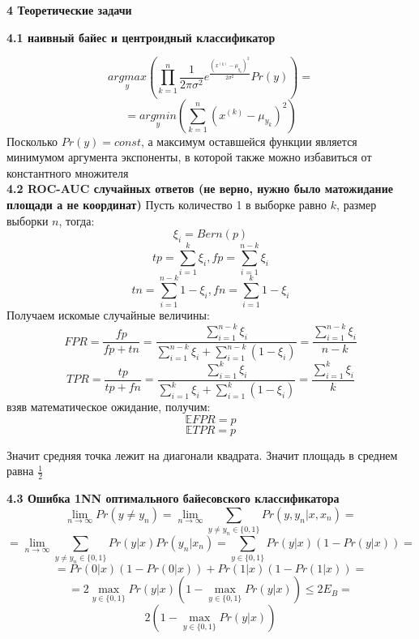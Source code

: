 \documentclass[11pt,a4paper]{article}
\begin{document}
\begin{center}
\Huge {
\noindent
\textbf{4 Теоретические задачи}
}
\end{center}
\Large {
\textbf {4.1 наивный байес и центроидный классификатор}
}

$$ \underset{y}{argmax} (\prod_{k=1}^{n} \frac{1}{2\pi \sigma^2}e^{\frac{(x^{(k)} - \mu_{y_k})^2}{2 \sigma^2}}  Pr(y)) = $$
$$=\underset{y}{argmin} (\sum_{k=1}^{n} (x^{(k)} - \mu_{y_k})^2) $$
Посколько $Pr(y) = const$,
а максимум оставшейся функции является минимумом аргумента экспоненты, в которой также можно избавиться от константного множителя
\\
\Large{
\textbf {4.2 ROC-AUC случайных ответов (не верно, нужно было матожидание площади а не координат)}
}
Пусть количество 1 в выборке равно $k$, размер выборки $n$, тогда:
\\
$$ \xi_i = Bern(p) $$
$$ tp = \sum_{i=1}^{k} \xi_i,  fp = \sum_{i=1}^{n - k} \xi_i$$
$$ tn = \sum_{i=1}^{n - k} 1- \xi_i,  fn = \sum_{i=1}^{k} 1 - \xi_i$$
Получаем искомые случайные величины:
$$ FPR = \frac{fp}{fp + tn} = \frac{\sum_{i=1}^{n-k} \xi_i}{\sum_{i=1}^{n-k} \xi_i + \sum_{i=1}^{n-k} (1 - \xi_i)} = \frac{\sum_{i=1}^{n-k} \xi_i}{n-k}$$
$$ TPR = \frac{tp}{tp + fn} = \frac{\sum_{i=1}^{k} \xi_i}{\sum_{i=1}^k \xi_i + \sum_{i=1}^{k} (1 - \xi_i)} = \frac{\sum_{i=1}^{k}  \xi_i}{k}$$
взяв математическое ожидание, получим:
$$ \mathbb{E} FPR = p$$
$$ \mathbb{E} TPR = p$$

Значит средняя точка лежит на диагонали квадрата. Значит площадь в среднем равна $\frac{1}{2}$

\Large{
\textbf {4.3 Ошибка 1NN оптимального байесовского классификатора}
}
$$ \lim_{n \to \infty} Pr(y \ne y_n) = \lim_{n \to \infty} \sum_{y \ne y_n \in \{0, 1\}} Pr(y, y_n | x, x_n) =$$
$$= \lim_{n \to \infty} \sum_{y \ne y_n \in \{0, 1\}} Pr(y|x) Pr(y_n|x_n) = \sum_{y \in \{0, 1\}} Pr(y|x) (1 - Pr(y|x)) = $$
$$= Pr(0|x)(1 - Pr(0|x)) + Pr(1 | x) (1 - Pr(1 | x)) = $$
$$= 2 \max_{y \in \{0, 1\}} Pr(y|x) (1 - \max_{y \in \{0, 1\}} Pr(y|x)) \le 2E_B = $$
$$ 2 (1 - \max_{y \in \{0, 1\}} Pr(y|x))$$
\end{document}
